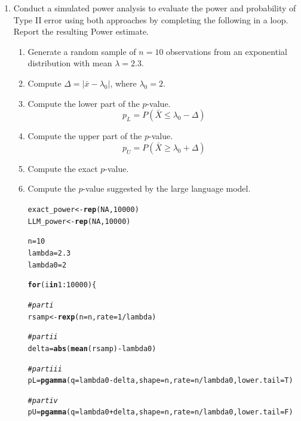 \documentclass{article}\usepackage[]{graphicx}\usepackage[]{xcolor}
\makeatletter
\newcommand{\hlnum}[1]{\textcolor[rgb]{0.686,0.059,0.569}{#1}}%
\newcommand{\hlcom}[1]{\textcolor[rgb]{0.678,0.584,0.686}{\textit{#1}}}%
\newcommand{\hlopt}[1]{\textcolor[rgb]{0,0,0}{#1}}%
\newcommand{\hldef}[1]{\textcolor[rgb]{0.345,0.345,0.345}{#1}}%
\newcommand{\hlkwa}[1]{\textcolor[rgb]{0.161,0.373,0.58}{\textbf{#1}}}%
\newcommand{\hlkwb}[1]{\textcolor[rgb]{0.69,0.353,0.396}{#1}}%
\newcommand{\hlkwc}[1]{\textcolor[rgb]{0.333,0.667,0.333}{#1}}%
\newcommand{\hlkwd}[1]{\textcolor[rgb]{0.737,0.353,0.396}{\textbf{#1}}}%
\newenvironment{kframe}{%
 \def\at@end@of@kframe{}%
 \ifinner\ifhmode%
  \def\at@end@of@kframe{\end{minipage}}%
  \begin{minipage}{\columnwidth}%
 \fi\fi%
 \def\FrameCommand##1{\hskip\@totalleftmargin \hskip-\fboxsep
 \colorbox{shadecolor}{##1}\hskip-\fboxsep
     \hskip-\linewidth \hskip-\@totalleftmargin \hskip\columnwidth}%
 \MakeFramed {\advance\hsize-\width
   \@totalleftmargin\z@ \linewidth\hsize
   \@setminipage}}%
 {\par\unskip\endMakeFramed%
 \at@end@of@kframe}
\newenvironment{knitrout}{}{} %
\makeatother
\begin{document}
\begin{enumerate}
\begin{enumerate}
\textcolor{red}{The $\alpha$ of the exact method is 0.0498. The $\alpha$ of the LLM approach is 0.0479}

\item Conduct a simulated power analysis to evaluate the power and 
probability of Type II error using both approaches by completing the 
following in a loop. Report the resulting Power estimate.
\begin{enumerate}
\item Generate a random sample of $n=10$ observations from an exponential 
distribution with mean $\lambda=2.3$.
\item Compute $\Delta = \lvert \bar{x}-\lambda_0 \rvert$, where $\lambda_0=2$.
\item Compute the lower part of the $p$-value.
\[p_L = P(\bar{X} \leq \lambda_0 - \Delta)\]
\item Compute the upper part of the $p$-value.
\[p_U = P(\bar{X} \geq \lambda_0 + \Delta)\]
\item Compute the exact $p$-value.
\item Compute the $p$-value suggested by the large language model.

\begin{knitrout}\scriptsize
{}\color{fgcolor}\begin{kframe}
\begin{alltt}
\hldef{exact_power} \hlkwb{<-} \hlkwd{rep}\hldef{(}\hlnum{NA}\hldef{,} \hlnum{10000}\hldef{)}
\hldef{LLM_power} \hlkwb{<-} \hlkwd{rep}\hldef{(}\hlnum{NA}\hldef{,} \hlnum{10000}\hldef{)}

\hldef{n} \hlkwb{=} \hlnum{10}
\hldef{lambda} \hlkwb{=} \hlnum{2.3}
\hldef{lambda0} \hlkwb{=} \hlnum{2}

\hlkwa{for} \hldef{(i} \hlkwa{in} \hlnum{1}\hlopt{:}\hlnum{10000}\hldef{)\{}

  \hlcom{# part i}
  \hldef{rsamp} \hlkwb{<-} \hlkwd{rexp}\hldef{(}\hlkwc{n} \hldef{= n,} \hlkwc{rate} \hldef{=} \hlnum{1}\hlopt{/}\hldef{lambda)}

  \hlcom{# part ii}
  \hldef{delta} \hlkwb{=} \hlkwd{abs}\hldef{(}\hlkwd{mean}\hldef{(rsamp)} \hlopt{-} \hldef{lambda0)}

  \hlcom{#part iii}
  \hldef{pL} \hlkwb{=} \hlkwd{pgamma}\hldef{(}\hlkwc{q} \hldef{= lambda0}\hlopt{-}\hldef{delta,} \hlkwc{shape} \hldef{= n,} \hlkwc{rate} \hldef{= n}\hlopt{/}\hldef{lambda0,} \hlkwc{lower.tail} \hldef{= T)}

  \hlcom{# part iv}
  \hldef{pU} \hlkwb{=} \hlkwd{pgamma}\hldef{(}\hlkwc{q} \hldef{= lambda0}\hlopt{+}\hldef{delta,} \hlkwc{shape} \hldef{= n,} \hlkwc{rate} \hldef{= n}\hlopt{/}\hldef{lambda0,} \hlkwc{lower.tail} \hldef{= F)}


\end{alltt}
\end{kframe}
\end{knitrout}
\end{enumerate}
\end{enumerate}
\end{enumerate}
\end{document}
